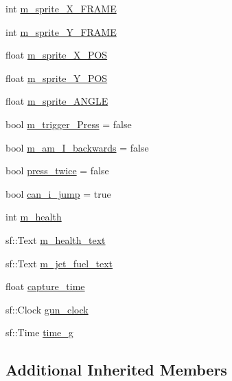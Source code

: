 \begin{DoxyCompactItemize}
\item 
int \hyperlink{classSekander_1_1Main__Player_a64bcbd5f0670d0e09dc50da88bbdf17e}{m\+\_\+sprite\+\_\+\+X\+\_\+\+F\+R\+A\+ME}
\item 
int \hyperlink{classSekander_1_1Main__Player_a0228218bfc278df504c0e11635b6b247}{m\+\_\+sprite\+\_\+\+Y\+\_\+\+F\+R\+A\+ME}
\item 
float \hyperlink{classSekander_1_1Main__Player_a1bb12bb0093d4875f616d35b64c0c576}{m\+\_\+sprite\+\_\+\+X\+\_\+\+P\+OS}
\item 
float \hyperlink{classSekander_1_1Main__Player_acd6d8d9cb64e2e64c9c68fdb8a39bc73}{m\+\_\+sprite\+\_\+\+Y\+\_\+\+P\+OS}
\item 
float \hyperlink{classSekander_1_1Main__Player_ad384003a5eb6bf3a4afda4652183e79c}{m\+\_\+sprite\+\_\+\+A\+N\+G\+LE}
\item 
bool \hyperlink{classSekander_1_1Main__Player_a9b05bc050c0ad2dbb0e2e5d6996437ad}{m\+\_\+trigger\+\_\+\+Press} = false
\item 
bool \hyperlink{classSekander_1_1Main__Player_a8c09a161746d48aa23a36908eed1241a}{m\+\_\+am\+\_\+\+I\+\_\+backwards} = false
\item 
bool \hyperlink{classSekander_1_1Main__Player_a1a46f90029272d60ea9eb202f37a3ede}{press\+\_\+twice} = false
\item 
bool \hyperlink{classSekander_1_1Main__Player_a141ff14ce7f44cd84c1a1d93bcbb49da}{can\+\_\+i\+\_\+jump} = true
\item 
int \hyperlink{classSekander_1_1Main__Player_ac41d33583f05af81a3f6ec42c7925963}{m\+\_\+health}
\item 
sf\+::\+Text \hyperlink{classSekander_1_1Main__Player_afed990c3a89e6fcbe322d814d3fa1ea1}{m\+\_\+health\+\_\+text}
\item 
sf\+::\+Text \hyperlink{classSekander_1_1Main__Player_ad8964a5a09d1f3f7812138ac1a9d1123}{m\+\_\+jet\+\_\+fuel\+\_\+text}
\item 
float \hyperlink{classSekander_1_1Main__Player_a6a06633c43751684ebdf31dc6a261c38}{capture\+\_\+time}
\item 
sf\+::\+Clock \hyperlink{classSekander_1_1Main__Player_a1d1774274c0cd58f973b56113d8539cf}{gun\+\_\+clock}
\item 
sf\+::\+Time \hyperlink{classSekander_1_1Main__Player_a0cfd9e7c3c8b23dd2051c93ae3ea23c6}{time\+\_\+g}
\end{DoxyCompactItemize}
\subsection*{Additional Inherited Members}


